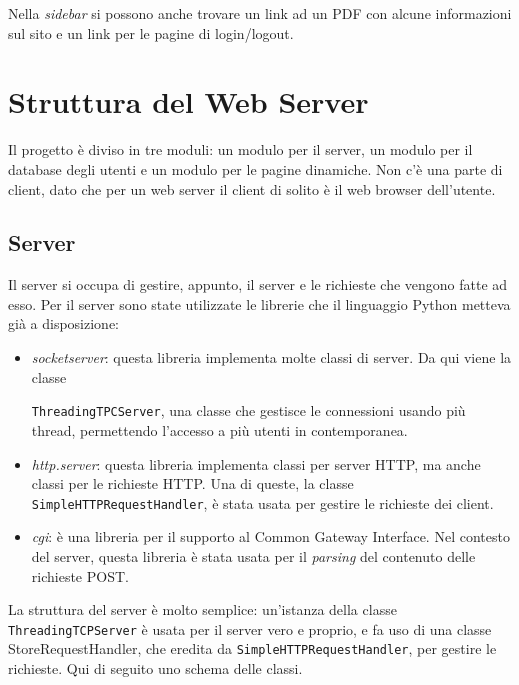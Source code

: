 \documentclass[a4paper,12pt]{report}
\begin{document}
Nella \textit{sidebar} si possono anche trovare un link ad un PDF con alcune informazioni sul sito e un link per le pagine di login/logout.


\chapter{Struttura del Web Server}

Il progetto è diviso in tre moduli: un modulo per il server, un modulo per il database degli utenti e un modulo per le pagine dinamiche. Non c'è una parte di client, dato che per un web server il client di solito è il web browser dell'utente.

\section{Server}

Il server si occupa di gestire, appunto, il server e le richieste che vengono fatte ad esso. Per il server sono state utilizzate le librerie che il linguaggio Python metteva già a disposizione:
\begin{itemize}
\item \textit{socketserver}: questa libreria implementa molte classi di server. Da qui viene la classe

\texttt{ThreadingTPCServer}, una classe che gestisce le connessioni usando più thread, permettendo l'accesso a più utenti in contemporanea.
\item \textit{http.server}: questa libreria implementa classi per server HTTP, ma anche classi per le richieste HTTP. Una di queste, la classe \texttt{SimpleHTTPRequestHandler}, è stata usata per gestire le richieste dei client.
\item \textit{cgi}: è una libreria per il supporto al Common Gateway Interface. Nel contesto del server, questa libreria è stata usata per il \textit{parsing} del contenuto delle richieste POST.
\end{itemize}

La struttura del server è molto semplice: un'istanza della classe \texttt{ThreadingTCPServer} è usata per il server vero e proprio, e fa uso di una classe StoreRequestHandler, che eredita da \texttt{SimpleHTTPRequestHandler}, per gestire le richieste. Qui di seguito uno schema delle classi.
\end{document}
